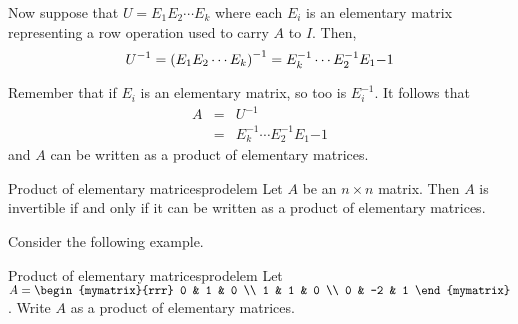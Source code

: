 Now suppose that $U = E_1 E_2 \cdots E_k$ where each $E_i$ is an elementary matrix representing a row operation used to carry $A$ to $I$. Then, 
\[
U^{-1} = \left(E_1 E_2 \cdots E_k \right) ^{-1}  =  E_k^{-1} \cdots E_2^{-1} E_1{-1} 
\]

Remember that if $E_i$ is an elementary matrix, so too is $E_i^{-1}$. 
It follows that 
\begin{eqnarray*}
A&=& U^{-1} \\
&=&  E_k^{-1} \cdots E_2^{-1} E_1{-1}
\end{eqnarray*}
and $A$ can be written as a product of elementary matrices. 

\begin{theorem}{Product of elementary matrices}{prodelem}
Let $A$ be an $n \times n$ matrix. Then $A$ is invertible if and only if it can be written as a product of elementary matrices.
\end{theorem}

Consider the following example.

\begin{example}{Product of elementary matrices}{prodelem}
Let $A = \begin{mymatrix}{rrr}
0 & 1 & 0 \\
1 & 1 & 0 \\
0 & -2 & 1 
\end{mymatrix}$. 
Write $A$ as a product of elementary matrices. 
\end{example}

